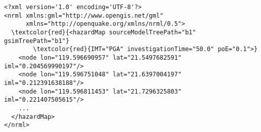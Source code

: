 \begin{Verbatim}[frame=single, commandchars=\\\{\}, fontsize=\small]
<?xml version='1.0' encoding='UTF-8'?>
<nrml xmlns:gml="http://www.opengis.net/gml"
      xmlns="http://openquake.org/xmlns/nrml/0.5">
  \textcolor{red}{<hazardMap sourceModelTreePath="b1" gsimTreePath="b1"}
        \textcolor{red}{IMT="PGA" investigationTime="50.0" poE="0.1">}
    <node lon="119.596690957" lat="21.5497682591" iml="0.204569990197"/>
    <node lon="119.596751048" lat="21.6397004197" iml="0.212391638188"/>
    <node lon="119.596811453" lat="21.7296325803" iml="0.221407505615"/>
    ...
  </hazardMap>
</nrml>
\end{Verbatim}